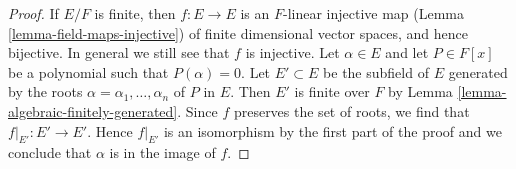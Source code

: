 \documentclass[10pt,a4paper]{amsart}
\theoremstyle{plain}
\theoremstyle{definition}
\theoremstyle{remark}
\numberwithin{equation}{subsection}
\begin{document}
\begin{proof}
If $E/F$ is finite, then $f : E \to E$ is an $F$-linear
injective map (Lemma \ref{lemma-field-maps-injective})
of finite dimensional vector spaces, and hence bijective.
In general we still see that $f$ is injective.
Let $\alpha \in E$ and let $P \in F[x]$ be a
polynomial such that $P(\alpha) = 0$.
Let $E' \subset E$ be the subfield of $E$ generated
by the roots $\alpha = \alpha_1, \ldots, \alpha_n$ of $P$ in $E$.
Then $E'$ is finite over $F$ by Lemma \ref{lemma-algebraic-finitely-generated}.
Since $f$ preserves the set of roots, we find that
$f|_{E'} : E' \to E'$. Hence $f|_{E'}$ is an isomorphism
by the first part of the proof and we conclude that $\alpha$
is in the image of $f$.
\end{proof}
\end{document}
